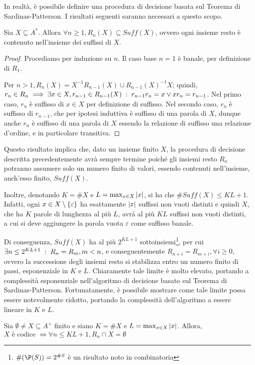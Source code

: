 In realtà, è possibile definire una procedura di decisione basata sul Teorema di Sardinas-Patterson.
I risultati seguenti saranno necessari a questo scopo.
\begin{proposition}\label{prop:rest_sets_subset_suffix}
  Sia \(X \subseteq A^*\). Allora \(\forall n \geq 1, R_n(X) \subseteq Suff(X)\), ovvero ogni insieme resto è contenuto nell'insieme dei suffissi di \(X\).
\end{proposition}
\begin{proof}
  Procediamo per induzione su \(n\).
  Il caso base \(n=1\) è banale, per definizione di \(R_1\).

  Per \(n>1, R_n(X)=X^{-1}R_{n-1}(X) \cup {R_{n-1}(X)}^{-1}X\); quindi, \(r_n \in R_n \implies \exists x \in X, r_{n-1}\in R_{n-1}(X) \;:\; r_{n-1}r_n = x \lor xr_n = r_{n-1}\).
  Nel primo caso, \(r_n\) è suffisso di \(x \in X\) per definizione di suffisso.
  Nel secondo caso, \(r_{n}\) è suffisso di \(r_{n-1}\), che per ipotesi induttiva è suffisso di una parola di \(X\), dunque anche \(r_n\) è suffisso di una parola di \(X\) essendo la relazione di suffisso una relazione d'ordine, e in particolare transitiva.
\end{proof}

Questo risultato implica che, dato un insieme finito \(X\), la procedura di decisione descritta precedentemente avrà sempre termine poiché gli insiemi resto \(R_n\) potranno assumere solo un numero finito di valori, essendo contenuti nell'insieme, anch'esso finito, \(Suff(X)\).

Inoltre, denotando \(K = \# X\) e \(L = \max_{x \in X} \left|x\right|\), si ha che \(\# Suff(X) \leq KL+1\).
Infatti, ogni \( x \in X \setminus \set{\varepsilon}\) ha esattamente \(\left|x\right|\) suffissi non vuoti distinti e quindi \(X\), che ha \(K\) parole di lunghezza al più \(L\), avrà al più \(KL\) suffissi non vuoti distinti, a cui si deve aggiungere la parola vuota \(\varepsilon\) come suffisso banale.

Di conseguenza, \(Suff(X)\) ha al più \(2^{KL+1}\) sottoinsiemi\footnote{\(\#(\P(S)) = 2^{\#S}\) è un risultato noto in combinatoria}, per cui \(\exists n \leq 2^{KL+1} \;:\; R_n = R_m, m < n\), e conseguentemente \(R_{n+i} = R_{m+i}, \forall i \geq 0\), ovvero la successione degli insiemi resto si stabilizza entro un numero finito di passi, esponenziale in \(K\) e \(L\).
Chiaramente tale limite è molto elevato, portando a complessità esponenziale nell'algoritmo di decisione basato sul Teorema di Sardinas-Patterson.
Fortunatamente, è possibile mostrare come tale limite possa essere notevolmente ridotto, portando la complessità dell'algoritmo a essere lineare in \(K\) e \(L\).
\begin{theorem}[Levanshtein???]
  Sia \(\emptyset \neq X \subseteq A^+\) finito e siano \(K = \# X\) e \(L = \max_{x \in X} \left|x\right|\).
  Allora, \(X \text{ è codice } \iff \forall n \leq KL +1, R_n \cap X = \emptyset\)
\end{theorem}

